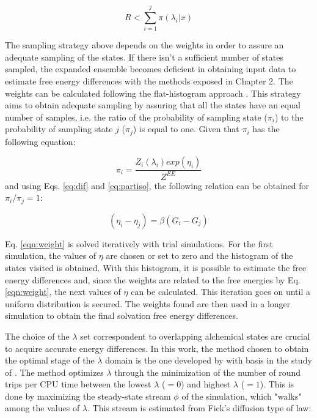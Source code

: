 \begin{equation}
R < \sum_{i=1}^{j} \pi(\lambda_{i}|x) 
\label{eqn:relee2}
\end{equation} 

The sampling strategy above depends on the weights in order to assure an adequate sampling of the states. If there isn't a sufficient number of states sampled, the expanded ensemble becomes deficient in obtaining input data to estimate free energy differences with the methods exposed in Chapter 2. The weights can be calculated following the flat-histogram approach \cite{bernd1992,bernd1993,dayal2004}. This strategy aims to obtain adequate sampling by assuring that all the states have an equal number of samples, i.e. the ratio of the probability of sampling state ($\pi_{i}$) to the probability of sampling state $j$ ($\pi_{j}$) is equal to one. Given that $\pi_{i}$ has the following equation:

\begin{equation}
\pi_{i} = \dfrac{Z_{i}(\lambda_{i}) exp(\eta_{i})}{Z^{EE}} 
\label{eqn:wei1}
\end{equation} 
and using Eqs. \ref{eq:dif} and \ref {eq:partiso}, the following relation can be obtained for $\pi_{i}/\pi_{j}=1$:

\begin{equation}
(\eta_{i} - \eta_{j}) = \beta(G_i-G_j)
\label{eqn:weight}
\end{equation}

Eq. \eqref{eqn:weight} is solved iteratively with trial simulations. For the first simulation, the values of $\eta$ are chosen or set to zero and the histogram of the states visited is obtained. With this histogram, it is possible to estimate the free energy differences and, since the weights are related to the free energies by Eq. \eqref{eqn:weight}, the next values of $\eta$ can be calculated. This iteration goes on until a uniform distribution is secured. The weights found are then used in a longer simulation to obtain the final solvation free energy differences.

The choice of the $\lambda$ set correspondent to overlapping alchemical states are crucial to acquire accurate energy differences. In this work, the method chosen to obtain the optimal stage of the $\lambda$ domain is the one developed by  with basis in the study of  . The method optimizes $\lambda$ through the minimization of the number of round trips per CPU time between the lowest $\lambda$ ($=0$) and highest $\lambda$ ($=1$). This is done by maximizing the steady-state stream $\phi$ of the simulation, which "walks" among the values of $\lambda$. This stream is estimated from Fick's diffusion type of law:


